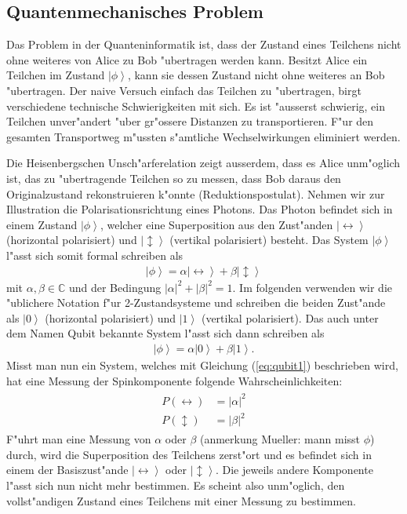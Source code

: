 \begin{refsection}
\subsection{Quantenmechanisches Problem}
Das Problem in der Quanteninformatik ist, dass der Zustand eines Teilchens nicht ohne weiteres von Alice zu Bob "ubertragen werden kann. Besitzt Alice ein Teilchen im Zustand $\left|\phi\right\rangle$, kann sie dessen Zustand nicht ohne weiteres an Bob "ubertragen. Der naive Versuch einfach das Teilchen zu "ubertragen, birgt verschiedene technische Schwierigkeiten mit sich. Es ist "ausserst schwierig, ein Teilchen unver"andert "uber gr"ossere Distanzen zu transportieren. F"ur den gesamten Transportweg m"ussten s"amtliche Wechselwirkungen eliminiert werden. 

Die Heisenbergschen Unsch"arferelation zeigt ausserdem, dass es Alice unm"oglich ist, das zu "ubertragende Teilchen so zu messen, dass Bob daraus den Originalzustand rekonstruieren k"onnte (Reduktionspostulat). Nehmen wir zur Illustration die Polarisationsrichtung eines Photons. Das Photon befindet sich in einem Zustand $\left|\phi\right\rangle$, welcher eine Superposition aus den Zust"anden $\left|\leftrightarrow\right\rangle$ (horizontal polarisiert) und $\left|\updownarrow\right\rangle$ (vertikal polarisiert) besteht. Das System $\left|\phi\right\rangle$ l"asst sich somit formal schreiben als
\begin{align}\label{eq:qubit1}
\left|\phi\right\rangle = \alpha\left|\leftrightarrow\right\rangle + \beta\left|\updownarrow\right\rangle 
\end{align}
mit $\alpha, \beta \in \mathbb{C}$ und der Bedingung $\left|\alpha\right|^{2} + \left|\beta\right|^{2} = 1$. Im folgenden verwenden wir die "ublichere Notation f"ur 2-Zustandsysteme und schreiben die beiden Zust"ande als $\left| 0 \right\rangle$ (horizontal polarisiert) und $\left| 1 \right\rangle$ (vertikal polarisiert). Das auch unter dem Namen Qubit bekannte System l"asst sich dann schreiben als 
\begin{align}\label{eq:qubit2}
\left|\phi\right\rangle = \alpha\left|0\right\rangle + \beta\left|1\right\rangle.
\end{align}
Misst man nun ein System, welches mit Gleichung (\ref{eq:qubit1}) beschrieben wird, hat eine Messung der Spinkomponente folgende Wahrscheinlichkeiten:
\begin{align}
	\begin{split}
		P\left(\leftrightarrow\right) & =\left|\alpha\right|^2  \\
	    P\left(\updownarrow\right) & =\left|\beta\right|^2
	\end{split}
\end{align}
F"uhrt man eine Messung von $\alpha$ oder $\beta$ (anmerkung Mueller: mann misst $\phi$) durch, wird die Superposition des Teilchens zerst"ort und es befindet sich in einem der Basiszust"ande $\left|\leftrightarrow\right\rangle$ oder $\left|\updownarrow\right\rangle$. Die jeweils andere Komponente l"asst sich nun nicht mehr bestimmen. Es scheint also unm"oglich, den vollst"andigen Zustand eines Teilchens mit einer Messung zu bestimmen.

\end{refsection}
